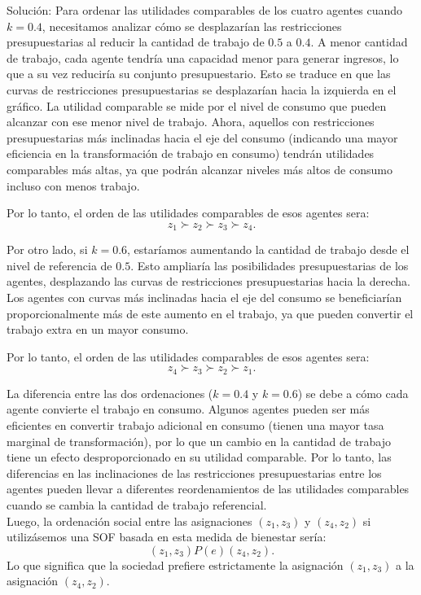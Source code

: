 \begin{enumerate}
	Solución: Para ordenar las utilidades comparables de los cuatro agentes cuando $k = 0.4$, necesitamos analizar cómo se desplazarían las restricciones presupuestarias al reducir la cantidad de trabajo de $0.5$ a $0.4$. A menor cantidad de trabajo, cada agente tendría una capacidad menor para generar ingresos, lo que a su vez reduciría su conjunto presupuestario. Esto se traduce en que las curvas de restricciones presupuestarias se desplazarían hacia la izquierda en el gráfico. La utilidad comparable se mide por el nivel de consumo que pueden alcanzar con ese menor nivel de trabajo. Ahora, aquellos con restricciones presupuestarias más inclinadas hacia el eje del consumo (indicando una mayor eficiencia en la transformación de trabajo en consumo) tendrán utilidades comparables más altas, ya que podrán alcanzar niveles más altos de consumo incluso con menos trabajo.

	Por lo tanto, el orden de las utilidades comparables de esos agentes sera:
	$$z_1 \succ z_2 \succ z_3 \succ z_4.$$

	Por otro lado, si $k = 0.6$, estaríamos aumentando la cantidad de trabajo desde el nivel de referencia de $0.5$. Esto ampliaría las posibilidades presupuestarias de los agentes, desplazando las curvas de restricciones presupuestarias hacia la derecha. Los agentes con curvas más inclinadas hacia el eje del consumo se beneficiarían proporcionalmente más de este aumento en el trabajo, ya que pueden convertir el trabajo extra en un mayor consumo.

	Por lo tanto, el orden de las utilidades comparables de esos agentes sera:
	$$z_4 \succ z_3 \succ z_2 \succ z_1.$$

	La diferencia entre las dos ordenaciones ($k = 0.4$ y $k = 0.6$) se debe a cómo cada agente convierte el trabajo en consumo. Algunos agentes pueden ser más eficientes en convertir trabajo adicional en consumo (tienen una mayor tasa marginal de transformación), por lo que un cambio en la cantidad de trabajo tiene un efecto desproporcionado en su utilidad comparable. Por lo tanto, las diferencias en las inclinaciones de las restricciones presupuestarias entre los agentes pueden llevar a diferentes reordenamientos de las utilidades comparables cuando se cambia la cantidad de trabajo referencial.\\

	Luego, la ordenación social entre las asignaciones $(z_1, z_3)$ y $(z_4, z_2)$ si utilizásemos una SOF basada en esta medida de bienestar sería:
	$$(z_1,z_3)P(e) (z_4,z_2).$$
	Lo que significa que la sociedad prefiere estrictamente la asignación $(z_1,z_3)$ a la asignación $(z_4,z_2)$.


\end{enumerate}

